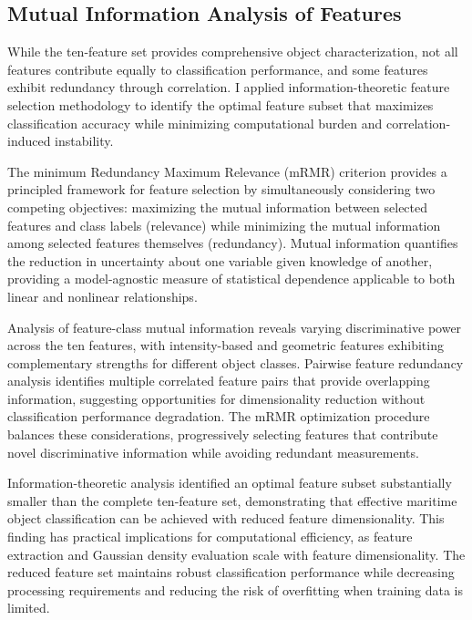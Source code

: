 \documentclass[../main.tex]{subfiles}
\begin{document}
\subsection{Mutual Information Analysis of Features} \label{sec:gbcache_MI_features}

While the ten-feature set provides comprehensive object characterization, not all features contribute equally to classification performance, and some features exhibit redundancy through correlation.
I applied information-theoretic feature selection methodology to identify the optimal feature subset that maximizes classification accuracy while minimizing computational burden and correlation-induced instability.

The minimum Redundancy Maximum Relevance (mRMR) criterion provides a principled framework for feature selection by simultaneously considering two competing objectives: maximizing the mutual information between selected features and class labels (relevance) while minimizing the mutual information among selected features themselves (redundancy).
Mutual information quantifies the reduction in uncertainty about one variable given knowledge of another, providing a model-agnostic measure of statistical dependence applicable to both linear and nonlinear relationships.

Analysis of feature-class mutual information reveals varying discriminative power across the ten features, with intensity-based and geometric features exhibiting complementary strengths for different object classes.
Pairwise feature redundancy analysis identifies multiple correlated feature pairs that provide overlapping information, suggesting opportunities for dimensionality reduction without classification performance degradation.
The mRMR optimization procedure balances these considerations, progressively selecting features that contribute novel discriminative information while avoiding redundant measurements.

Information-theoretic analysis identified an optimal feature subset substantially smaller than the complete ten-feature set, demonstrating that effective maritime object classification can be achieved with reduced feature dimensionality.
This finding has practical implications for computational efficiency, as feature extraction and Gaussian density evaluation scale with feature dimensionality.
The reduced feature set maintains robust classification performance while decreasing processing requirements and reducing the risk of overfitting when training data is limited.
\end{document}
